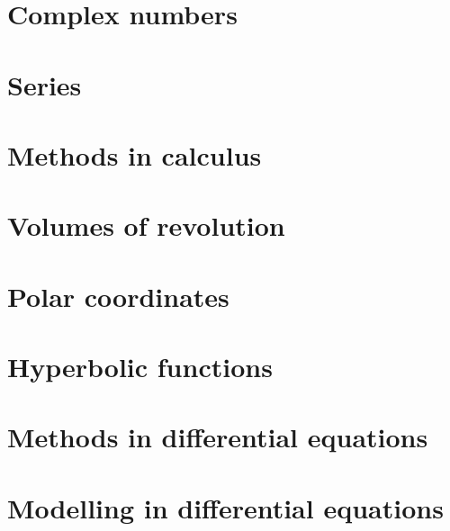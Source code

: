 \chapter{Complex numbers}

\chapter{Series}

\chapter{Methods in calculus}

\chapter{Volumes of revolution}

\chapter{Polar coordinates}

\chapter{Hyperbolic functions}

\chapter{Methods in differential equations}

\chapter{Modelling in differential equations}
